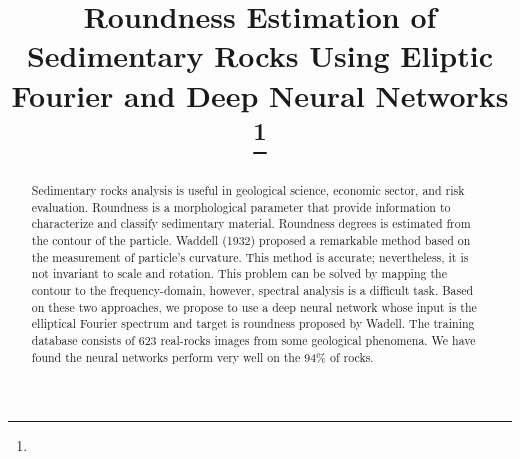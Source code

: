 \documentclass[conference]{IEEEtran}
\begin{document}
\title{Roundness Estimation of Sedimentary Rocks Using Eliptic Fourier and Deep Neural Networks\\
{\footnotesize \textsuperscript{}}
\thanks{}
}

\author{
\and
{}
\and
{}
}

\maketitle

\thispagestyle{firststyle}
\renewcommand{\headrulewidth}{0in}
\pagestyle{empty}


\pagestyle{fancy}



\begin{abstract}

Sedimentary rocks analysis is useful in geological science, economic sector, and risk evaluation. Roundness is a morphological parameter that provide information to characterize and classify sedimentary material.  Roundness degrees is estimated from the contour of the particle. Waddell (1932) proposed a remarkable method based on the measurement of particle's curvature.  This method is accurate; nevertheless, it is not invariant to scale and rotation. This problem can be solved by mapping the contour to the frequency-domain, however, spectral analysis is a difficult task. Based on these two approaches, we propose to use a deep neural network whose input is the elliptical Fourier spectrum and target is roundness proposed by Wadell. The training database consists of 623 real-rocks images from some geological phenomena. We have found the neural networks perform very well on the 94\% of rocks.
\end{abstract}
\end{document}
